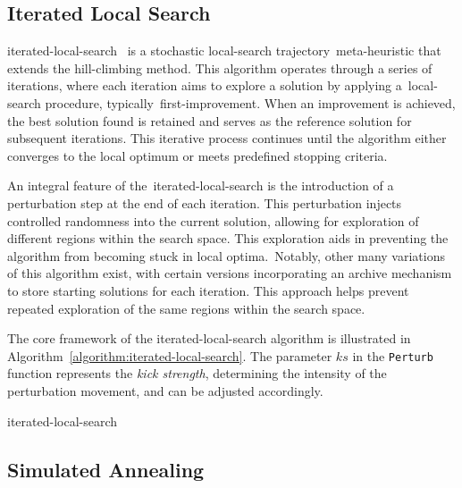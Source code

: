 \subsection{Iterated Local Search}
\label{subsec:iterated-local-search}

\acrfull{iterated-local-search}~\cite{lourenco2010iterateda,luke2013essentialsa,blum2003metaheuristics}
is a stochastic \acrshort{local-search} trajectory~\acrshort{meta-heuristic} that
extends the \acrshort{hill-climbing} method. This algorithm operates through a
series of iterations, where each iteration aims to explore a solution by
applying a~\acrshort{local-search} procedure,
typically~\acrshort{first-improvement}. When an improvement is achieved, the
best solution found is retained and serves as the reference solution for
subsequent iterations. This iterative process continues until the algorithm
either converges to the local optimum or meets predefined stopping criteria.

An integral feature of the~\acrshort{iterated-local-search} is the introduction
of a perturbation step at the end of each iteration. This perturbation injects
controlled randomness into the current solution, allowing for exploration of
different regions within the search space. This exploration aids in preventing
the algorithm from becoming stuck in local optima.~Notably, other many
variations of this algorithm exist, with certain versions incorporating an
archive mechanism to store starting solutions for each iteration. This approach
helps prevent repeated exploration of the same regions within the search space.

The core framework of the \acrshort{iterated-local-search} algorithm is
illustrated in Algorithm~\ref{algorithm:iterated-local-search}. The parameter
$ks$ in the \texttt{Perturb} function represents the \textit{kick strength},
determining the intensity of the perturbation movement, and can be
adjusted accordingly.

\begin{algorithm}
  
  \caption{\acrlong{iterated-local-search}}
  \label{algorithm:iterated-local-search}
\end{algorithm}

\subsection{Simulated Annealing}
\label{subsec:simulated-annealing}

